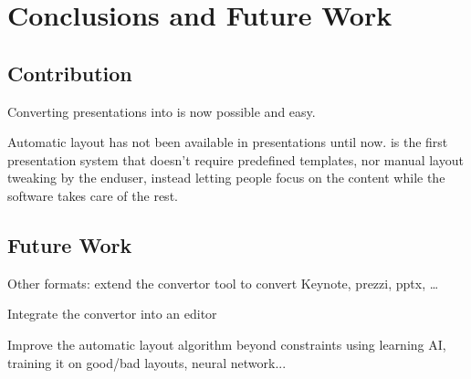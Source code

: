 
 \chapter{Conclusions and Future Work}


  \section{Contribution}


   Converting \ppt presentations into \mxp is now possible and easy.

   Automatic layout has not been available in presentations until now. \mxp is
   the first presentation system that doesn't require predefined templates, nor
   manual layout tweaking by the enduser, instead letting people focus on the
   content while the software takes care of the rest.

  \section{Future Work}


   Other formats: extend the convertor tool to convert Keynote, prezzi, pptx,
   \ldots

   Integrate the convertor into an \mxp editor

   Improve the automatic layout algorithm beyond constraints using learning AI,
   training it on good/bad layouts, neural network...

